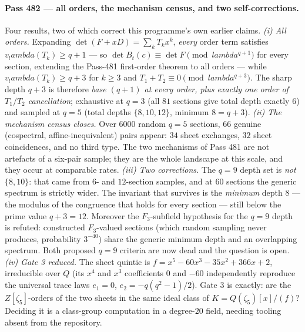\documentclass[12pt,a4paper]{article}
\def\mathbb#1{#1}%
\def\textbf#1{#1}%
\def\lambda{lambda}%
\theoremstyle{definition}
\newcommand{\FF}{\mathbb{F}}
\newcommand{\QQ}{\mathbb{Q}}
\newcommand{\ZZ}{\mathbb{Z}}
\begin{document}
\paragraph{Pass 482 --- all orders, the mechanism census, and two
self-corrections.}
Four results, two of which correct this programme's own earlier claims.
\emph{(i) All orders.}  Expanding $\det(F+xD)=\sum_k T_kx^k$, \emph{every}
order term satisfies $v_\lambda(T_k)\ge q{+}1$ --- so
$\det B_t(c)\equiv\det F \pmod{\lambda^{q+1}}$ for every section, extending
the Pass-481 first-order theorem to all orders --- while $v_\lambda(T_k)\ge q{+}3$
for $k\ge3$ and $T_1+T_2\equiv0\pmod{\lambda^{q+3}}$.  The sharp depth $q{+}3$
is therefore \emph{base $(q{+}1)$ at every order, plus exactly one order of
$T_1/T_2$ cancellation}; exhaustive at $q=3$ (all $81$ sections give total
depth exactly $6$) and sampled at $q=5$ (total depths $\{8,10,12\}$, minimum
$8=q{+}3$).  \emph{(ii) The mechanism census closes.}  Over $6000$ random
$q=5$ sections, $66$ genuine (cospectral, affine-inequivalent) pairs appear:
$34$ sheet exchanges, $32$ sheet coincidences, and \textbf{no third type}.
The two mechanisms of Pass 481 are not artefacts of a six-pair sample; they
are the whole landscape at this scale, and they occur at comparable rates.
\emph{(iii) Two corrections.}  The $q=9$ depth set is \emph{not} $\{8,10\}$:
that came from $6$- and $12$-section samples, and at $60$ sections the generic
spectrum is strictly wider.  The invariant that survives is the
\emph{minimum} depth $8$ --- the modulus of the congruence that holds for
every section --- still below the prime value $q{+}3=12$.  Moreover the
$\FF_3$-subfield hypothesis for the $q=9$ depth is refuted: constructed
$\FF_3$-valued sections (which random sampling never produces, probability
$3^{-40}$) share the generic minimum depth and an overlapping spectrum.  Both
proposed $q=9$ criteria are now dead and the question is open.
\emph{(iv) Gate 3 reduced.}  The sheet quintic is
$f=x^5-60x^3-35x^2+366x+2$, irreducible over $\QQ$ (its $x^4$ and $x^3$
coefficients $0$ and $-60$ independently reproduce the universal trace laws
$e_1=0$, $e_2=-q(q^2{-}1)/2$).  Gate 3 is exactly: are the
$\ZZ[\zeta_5]$-orders of the two sheets in the same ideal class of
$K=\QQ(\zeta_5)[x]/(f)$?  Deciding it is a class-group computation in a
degree-$20$ field, needing tooling absent from the repository.
\end{document}
